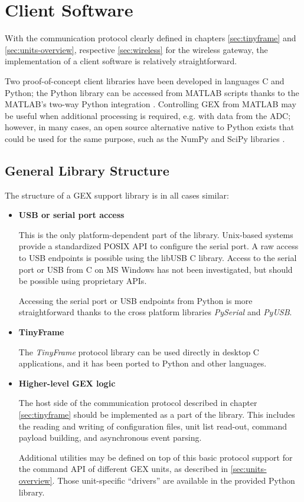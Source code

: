 \chapter{Client Software}

With the communication protocol clearly defined in chapters \ref{sec:tinyframe} and \ref{sec:units-overview}, respective \ref{sec:wireless} for the wireless gateway, the implementation of a client software is relatively straightforward.

Two proof-of-concept client libraries have been developed in languages C and Python; the Python library can be accessed from MATLAB scripts thanks to the MATLAB's two-way Python integration \cite{matlabpy}. Controlling GEX from MATLAB may be useful when additional processing is required, e.g. with data from the \gls{ADC}; however, in many cases, an open source alternative native to Python exists that could be used for the same purpose, such as the NumPy and SciPy libraries \cite{numpyscipy}.

\section{General Library Structure}

The structure of a GEX support library is in all cases similar:

\begin{itemize}
	\item \textbf{USB or serial port access}
	
		This is the only platform-dependent part of the library. Unix-based systems provide a standardized POSIX API to configure the serial port. A raw access to \gls{USB} endpoints is possible using the libUSB C library. Access to the serial port or \gls{USB} from C on MS Windows has not been investigated, but should be possible using proprietary APIs. 
		
		Accessing the serial port or \gls{USB} endpoints from Python is more straightforward thanks to the cross platform libraries \textit{PySerial} and \textit{PyUSB}.
		
	\item \textbf{TinyFrame} 
	
		The \textit{TinyFrame} protocol library can be used directly in desktop C applications, and it has been ported to Python and other languages.
		 
	\item \textbf{Higher-level GEX logic} 
	
		The host side of the communication protocol described in chapter \ref{sec:tinyframe} should be implemented as a part of the library. This includes the reading and writing of configuration files, unit list read-out, command payload building, and asynchronous event parsing.
		
		Additional utilities may be defined on top of this basic protocol support for the command API of different GEX units, as described in \ref{sec:units-overview}. Those unit-specific ``drivers'' are available in the provided Python library.
\end{itemize}

